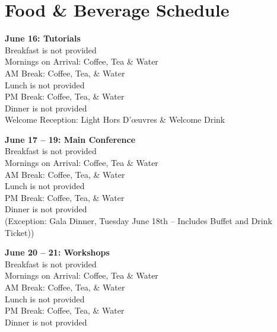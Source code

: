 \setheaders{}{}
\section{Food \& Beverage Schedule}{}

\textbf{June 16: Tutorials}\\
\hspace*{0.2in}Breakfast is not provided \\
\hspace*{0.2in}Mornings on Arrival: Coffee, Tea \& Water \\
\hspace*{0.2in}AM Break: Coffee, Tea, \& Water \\
\hspace*{0.2in}Lunch is not provided \\
\hspace*{0.2in}PM Break: Coffee, Tea, \& Water \\
\hspace*{0.2in}Dinner is not provided \\
\hspace*{0.2in}Welcome Reception: Light Hors D'\oe{}uvres \& Welcome Drink

\textbf{June 17 -- 19: Main Conference} \\
\hspace*{0.2in}Breakfast is not provided \\
\hspace*{0.2in}Mornings on Arrival: Coffee, Tea \& Water \\
\hspace*{0.2in}AM Break: Coffee, Tea, \& Water \\
\hspace*{0.2in}Lunch is not provided \\
\hspace*{0.2in}PM Break: Coffee, Tea, \& Water \\
\hspace*{0.2in}Dinner is not provided \\
\hspace*{0.2in}(Exception: Gala Dinner, Tuesday June 18th -- Includes Buffet and Drink Ticket))

\textbf{June 20 -- 21: Workshops} \\
\hspace*{0.2in}Breakfast is not provided \\
\hspace*{0.2in}Mornings on Arrival: Coffee, Tea \& Water \\
\hspace*{0.2in}AM Break: Coffee, Tea, \& Water \\
\hspace*{0.2in}Lunch is not provided \\
\hspace*{0.2in}PM Break: Coffee, Tea, \& Water \\
\hspace*{0.2in}Dinner is not provided


